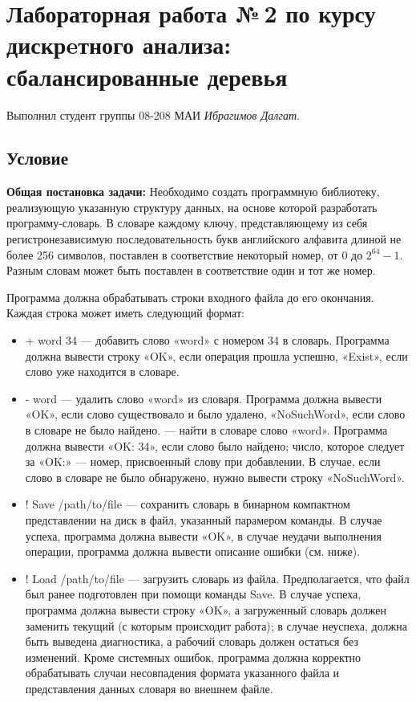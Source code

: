 \documentclass[12pt]{article}
\begin{document}
\section*{Лабораторная работа №\,2 по курсу дискрeтного анализа: сбалансированные деревья}

\noindent Выполнил студент группы 08-208 МАИ \textit{Ибрагимов Далгат}.

\subsection*{Условие}
\textbf{Общая постановка задачи:} Необходимо создать программную библиотеку, реализующую указанную структуру данных, на основе которой разработать программу-словарь. В словаре каждому ключу, представляющему из себя регистронезависимую последовательность букв английского алфавита длиной не более 256 символов, поставлен в соответствие некоторый номер, от 0 до ${2^{64} - 1}$. Разным словам может быть поставлен в соответствие один и тот же номер.

Программа должна обрабатывать строки входного файла до его окончания. Каждая строка может иметь следующий формат:
\begin{itemize}
\item+ word 34 — добавить слово «word» с номером 34 в словарь. Программа должна вывести строку «OK», если операция прошла успешно, «Exist», если слово уже находится в словаре.
\item- word — удалить слово «word» из словаря. Программа должна вывести «OK», если слово существовало и было удалено, «NoSuchWord», если слово в словаре не было найдено.
\itemword — найти в словаре слово «word». Программа должна вывести «OK: 34», если слово было найдено; число, которое следует за «OK:» — номер, присвоенный слову при добавлении. В случае, если слово в словаре не было обнаружено, нужно вывести строку «NoSuchWord».
\item! Save /path/to/file — сохранить словарь в бинарном компактном представлении на диск в файл, указанный парамером команды. В случае успеха, программа должна вывести «OK», в случае неудачи выполнения операции, программа должна вывести описание ошибки (см. ниже).
\item! Load /path/to/file — загрузить словарь из файла. Предполагается, что файл был ранее подготовлен при помощи команды Save. В случае успеха, программа должна вывести строку «OK», а загруженный словарь должен заменить текущий (с которым происходит работа); в случае неуспеха, должна быть выведена диагностика, а рабочий словарь должен остаться без изменений. Кроме системных ошибок, программа должна корректно обрабатывать случаи несовпадения формата указанного файла и представления данных словаря во внешнем файле.
\end{itemize}
\end{document}
